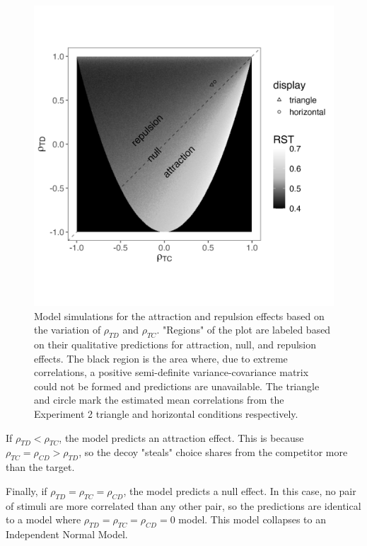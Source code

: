 \begin{figure}
   \includegraphics[width=\linewidth]{figures/3d_sim_rst.jpg}
   \caption{Model simulations for the attraction and repulsion effects based on the variation of $\rho_{TD}$ and $\rho_{TC}$. "Regions" of the plot are labeled based on their qualitative predictions for attraction, null, and repulsion effects. The black region is the area where, due to extreme correlations, a positive semi-definite variance-covariance matrix could not be formed and predictions are unavailable. The triangle and circle mark the estimated mean correlations from the Experiment 2 triangle and horizontal conditions respectively.}
   \label{fig:3d_model}
\end{figure}

If $\rho_{TD}<\rho_{TC}$, the model predicts an attraction effect. This is because $\rho_{TC}=\rho_{CD}>\rho_{TD}$, so the decoy "steals" choice shares from the competitor more than the target. 

Finally, if $\rho_{TD}=\rho_{TC}=\rho_{CD}$, the model predicts a null effect. In this case, no pair of stimuli are more correlated than any other pair, so the predictions are identical to a model where $\rho_{TD}=\rho_{TC}=\rho_{CD}=0$ model. This model collapses to an Independent Normal Model. 

